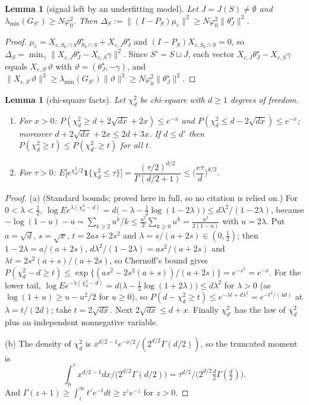 \documentclass[11pt]{article}
\newtheorem{lemma}[theorem]{Lemma}
\theoremstyle{definition}
\newcommand{\1}{\mathbf 1}
\newcommand{\vp}{\varphi_0^2}
\begin{document}
\begin{lemma}[signal left by an underfitting model]\label{lem:signal}
Let $J=J(S)\ne\emptyset$ and $\lambda_{\min}(G_{S'})\ge N\vp$. Then $\Delta_S:=\|(I-P_S)\mu_c\|^2\ge N\vp\|\theta^\star_J\|^2$.
\end{lemma}

\begin{proof}
$\mu_c=X_{c,S_0\cap S}\theta^\star_{S_0\cap S}+X_{c,J}\theta^\star_J$ and $(I-P_S)X_{c,S_0\cap S}=0$, so $\Delta_S=\min_{\gamma}\|X_{c,J}\theta^\star_J-X_{c,S}\gamma\|^2$. Since $S'=S\sqcup J$, each vector $X_{c,J}\theta^\star_J-X_{c,S}\gamma$ equals $X_{c,S'}\vartheta$ with $\vartheta=(\theta^\star_J,-\gamma)$, and $\|X_{c,S'}\vartheta\|^2\ge\lambda_{\min}(G_{S'})\|\vartheta\|^2\ge N\vp\|\theta^\star_J\|^2$.
\end{proof}

\begin{lemma}[chi-square facts]\label{lem:chi}
Let $\chi^2_d$ be chi-square with $d\ge1$ degrees of freedom.
\begin{enumerate}
\item[(a)] For $x>0$: $P(\chi^2_d\ge d+2\sqrt{dx}+2x)\le e^{-x}$ and $P(\chi^2_d\le d-2\sqrt{dx})\le e^{-x}$; moreover $d+2\sqrt{dx}+2x\le2d+3x$. If $d\le d'$ then $P(\chi^2_d\ge t)\le P(\chi^2_{d'}\ge t)$ for all $t$.
\item[(b)] For $\tau>0$: $E\big[e^{\chi^2_d/2}\1\{\chi^2_d\le\tau\}\big]=\dfrac{(\tau/2)^{d/2}}{\Gamma(d/2+1)}\le\Big(\dfrac{e\tau}{d}\Big)^{d/2}$.
\end{enumerate}
\end{lemma}

\begin{proof}
(a) (Standard bounds; proved here in full, so no citation is relied on.) For $0<\lambda<\frac12$, $\log Ee^{\lambda(\chi^2_d-d)}=d\big(-\lambda-\frac12\log(1-2\lambda)\big)\le d\lambda^2/(1-2\lambda)$, because $-\log(1-u)-u=\sum_{k\ge2}u^k/k\le\frac{u^2}2\sum_{k\ge0}u^k=\frac{u^2}{2(1-u)}$ with $u=2\lambda$. Put $a=\sqrt d$, $s=\sqrt x$, $t=2as+2s^2$ and $\lambda=s/(a+2s)\in(0,\frac12)$; then $1-2\lambda=a/(a+2s)$, $d\lambda^2/(1-2\lambda)=as^2/(a+2s)$ and $\lambda t=2s^2(a+s)/(a+2s)$, so Chernoff's bound gives $P(\chi^2_d-d\ge t)\le\exp\{(as^2-2s^2(a+s))/(a+2s)\}=e^{-s^2}=e^{-x}$. For the lower tail, $\log Ee^{-\lambda(\chi^2_d-d)}=d\big(\lambda-\frac12\log(1+2\lambda)\big)\le d\lambda^2$ for $\lambda>0$ (as $\log(1+u)\ge u-u^2/2$ for $u\ge0$), so $P(d-\chi^2_d\ge t)\le e^{-\lambda t+d\lambda^2}=e^{-t^2/(4d)}$ at $\lambda=t/(2d)$; take $t=2\sqrt{dx}$. Next $2\sqrt{dx}\le d+x$. Finally $\chi^2_{d'}$ has the law of $\chi^2_d$ plus an independent nonnegative variable.

(b) The density of $\chi^2_d$ is $x^{d/2-1}e^{-x/2}/(2^{d/2}\Gamma(d/2))$, so the truncated moment is
\[\int_0^\tau x^{d/2-1}dx\big/\big(2^{d/2}\Gamma(d/2)\big)=\tau^{d/2}\big/\big(2^{d/2}\tfrac d2\Gamma(\tfrac d2)\big).\] And $\Gamma(z+1)\ge\int_z^\infty t^ze^{-t}dt\ge z^ze^{-z}$ for $z>0$.
\end{proof}
\end{document}
